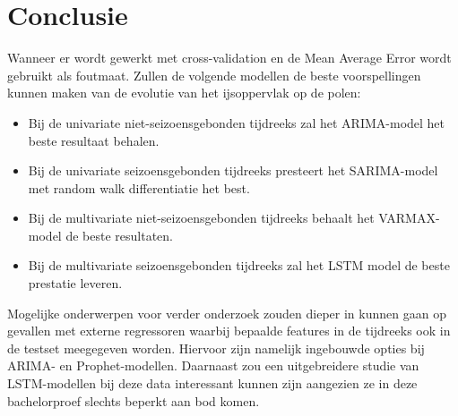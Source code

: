 
\chapter{Conclusie}
\label{ch:conclusie}


Wanneer er wordt gewerkt met cross-validation en de Mean Average Error wordt gebruikt als foutmaat. Zullen de volgende modellen de beste voorspellingen kunnen maken van de evolutie van het ijsoppervlak op de polen:
\begin{itemize}
    \item Bij de univariate niet-seizoensgebonden tijdreeks zal het ARIMA-model het beste resultaat behalen.
    \item Bij de univariate seizoensgebonden tijdreeks presteert het SARIMA-model met random walk differentiatie het best.
    \item Bij de multivariate niet-seizoensgebonden tijdreeks behaalt het VARMAX-model de beste resultaten.
    \item Bij de multivariate seizoensgebonden tijdreeks zal het LSTM model de beste prestatie leveren.\\
\end{itemize}


Mogelijke onderwerpen voor verder onderzoek zouden dieper in kunnen gaan op gevallen met externe regressoren waarbij bepaalde features in de tijdreeks ook in de testset meegegeven worden. Hiervoor zijn namelijk ingebouwde opties bij ARIMA- en Prophet-modellen. Daarnaast zou een uitgebreidere studie van LSTM-modellen bij deze data interessant kunnen zijn aangezien ze in deze bachelorproef slechts beperkt aan bod komen.
